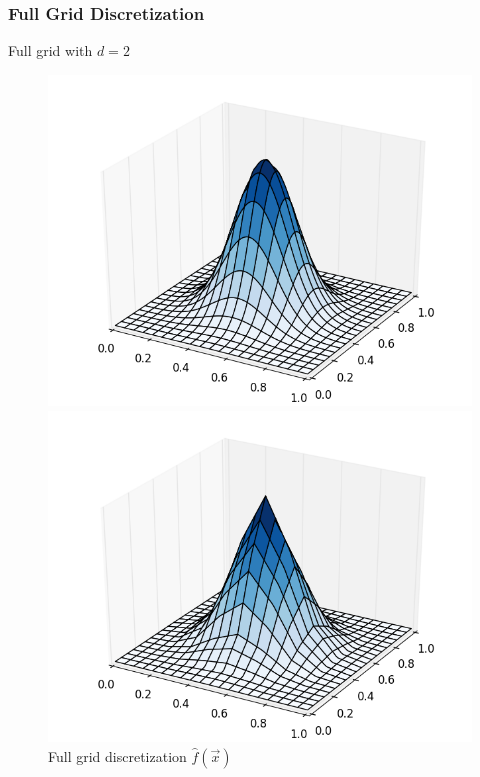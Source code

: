 \begin{frame}
  \frametitle{Full Grid Discretization}
  \topline
  \vspace{-10px}
  \begin{block}{Full grid with $d = 2$}

    \begin{figure}[!htb]
      \includegraphics[width=\linewidth]{images/2dgrid_1_1.png}
      \vspace{-12px}
      \caption{$f(x) = \mathcal{N}(\vec{x})$}
      \endminipage
      \includegraphics[width=\linewidth]{images/2dgrid_2_1.png}
      \vspace{-12px}
      \caption{Full grid discretization $\hat{f}(\vec{x})$}
      \endminipage
    \end{figure}
  \end{block}
\end{frame}

